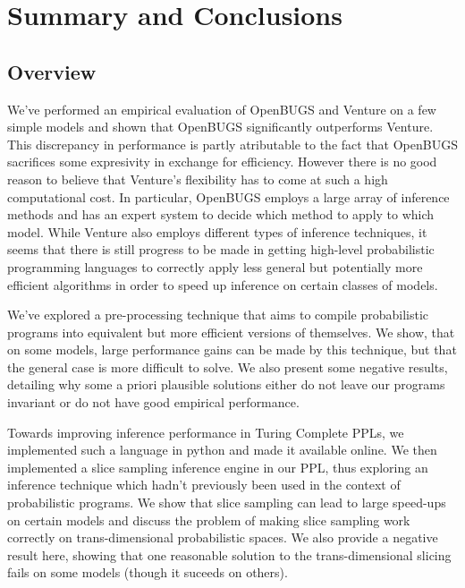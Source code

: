 \chapter{Summary and Conclusions}
\label{chap:conc}

\section{Overview}
We've performed an empirical evaluation of OpenBUGS and Venture on a few simple models and shown that OpenBUGS significantly outperforms Venture. This discrepancy in performance is partly atributable to the fact that OpenBUGS sacrifices some expresivity in exchange for efficiency. However there is no good reason to believe that Venture's flexibility has to come at such a high computational cost. In particular, OpenBUGS employs a large array of inference methods and has an expert system to decide which method to apply to which model. While Venture also employs different types of inference techniques, it seems that there is still progress to be made in getting high-level probabilistic programming languages to correctly apply less general but potentially more efficient algorithms in order to speed up inference on certain classes of models.

We've explored a pre-processing technique that aims to compile probabilistic programs into equivalent but more efficient versions of themselves. We show, that on some models, large performance gains can be made by this technique, but that the general case is more difficult to solve. We also present some negative results, detailing why some a priori plausible solutions either do not leave our programs invariant or do not have good empirical performance.

Towards improving inference performance in Turing Complete PPLs, we implemented such a language in python and made it available online. We then implemented a slice sampling inference engine in our PPL, thus exploring an inference technique which hadn't previously been used in the context of probabilistic programs. We show that slice sampling can lead to large speed-ups on certain models and discuss the problem of making slice sampling work correctly on trans-dimensional probabilistic spaces. We also provide a negative result here, showing that one reasonable solution to the trans-dimensional slicing fails on some models (though it suceeds on others).


